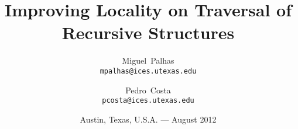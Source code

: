 

\titlehead{University of Texas%
\\%
\hfill Institute for Computational Engineering and Sciences%
\hfill Center for Distributed and Grid Computing}

\title{Improving Locality on Traversal of Recursive Structures}


\author{Miguel~Palhas\\\texttt{\smaller mpalhas@ices.utexas.edu}%
\and Pedro~Costa\\\texttt{\smaller pcosta@ices.utexas.edu}%
}

\date{Austin, Texas, U.S.A. --- August 2012}

\subject{Summer Internship}